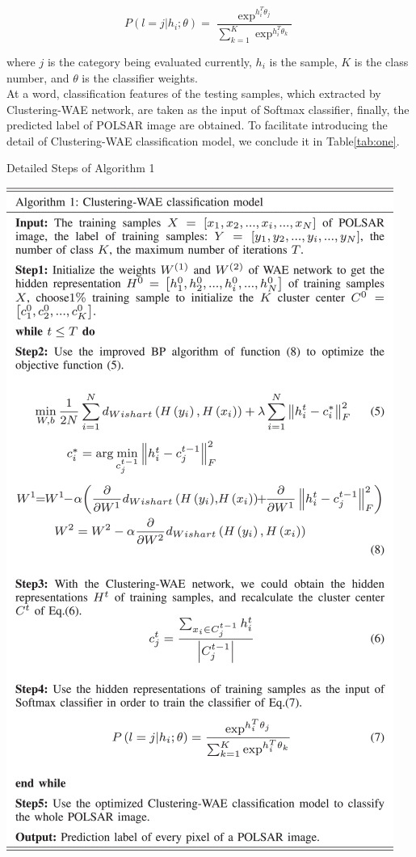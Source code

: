 \documentclass[11pt, a4paper, onecolumn, oneside]{article}
\begin{document}
\begin{equation} \label{eq:seven}
P\left ({ {l = j|{h_{i}};\theta } }\right ) = \frac {{{\exp ^{h_{i}^{T}{\theta _{j}}}}}}{{\sum \nolimits _{k = 1}^{K} {{\exp ^{h_{i}^{T}{\theta _{k}}}}} }}
\end{equation}

where $j$ is the category being evaluated currently, $h_i$ is the sample, $K$ is the class number, and $\theta$ is the classifier weights. \\

At a word, classification features of the testing samples, which extracted by Clustering-WAE network, are taken as the input of Softmax classifier, finally, the predicted label of POLSAR image are obtained. To facilitate introducing the detail of Clustering-WAE classification model, we conclude it in Table\ref{tab:one}.

\begin{table}
  \caption{Detailed Steps of Algorithm 1}
  \label{tab:one}
  \includegraphics[width=\linewidth]{table_1.jpg}
\end{table}
\end{document}
